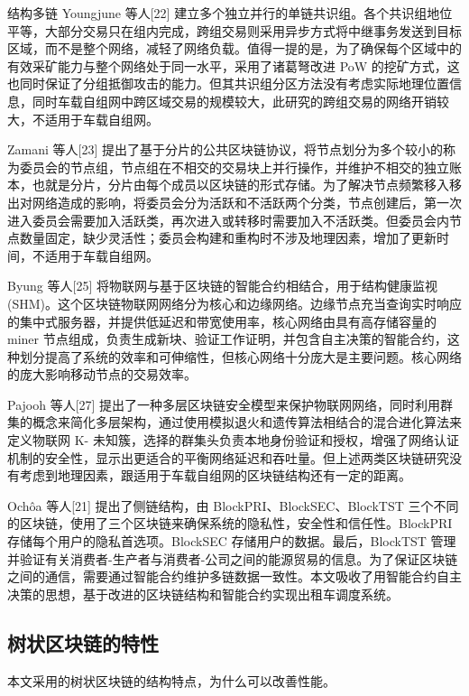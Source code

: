 结构多链
Youngjune 等人[22] 建立多个独立并行的单链共识组。各个共识组地位平等，大部分交易只在组内完成，跨组交易则采用异步方式将中继事务发送到目标区域，而不是整个网络，减轻了网络负载。值得一提的是，为了确保每个区域中的有效采矿能力与整个网络处于同一水平，采用了诸葛弩改进 PoW 的挖矿方式，这也同时保证了分组抵御攻击的能力。但其共识组分区方法没有考虑实际地理位置信息，同时车载自组网中跨区域交易的规模较大，此研究的跨组交易的网络开销较大，不适用于车载自组网。\par
Zamani 等人[23] 提出了基于分片的公共区块链协议，将节点划分为多个较小的称为委员会的节点组，节点组在不相交的交易块上并行操作，并维护不相交的独立账本，也就是分片，分片由每个成员以区块链的形式存储。为了解决节点频繁移入移出对网络造成的影响，将委员会分为活跃和不活跃两个分类，节点创建后，第一次进入委员会需要加入活跃类，再次进入或转移时需要加入不活跃类。但委员会内节点数量固定，缺少灵活性；委员会构建和重构时不涉及地理因素，增加了更新时间，不适用于车载自组网。\par

Byung 等人[25] 将物联网与基于区块链的智能合约相结合，用于结构健康监视 (SHM)。这个区块链物联网网络分为核心和边缘网络。边缘节点充当查询实时响应的集中式服务器，并提供低延迟和带宽使用率，核心网络由具有高存储容量的miner 节点组成，负责生成新块、验证工作证明，并包含自主决策的智能合约，这种划分提高了系统的效率和可伸缩性，但核心网络十分庞大是主要问题。核心网络的庞大影响移动节点的交易效率。\par

Pajooh 等人[27] 提出了一种多层区块链安全模型来保护物联网网络，同时利用群集的概念来简化多层架构，通过使用模拟退火和遗传算法相结合的混合进化算法来定义物联网 K- 未知簇，选择的群集头负责本地身份验证和授权，增强了网络认证机制的安全性，显示出更适合的平衡网络延迟和吞吐量。但上述两类区块链研究没有考虑到地理因素，跟适用于车载自组网的区块链结构还有一定的距离。\par

Ochôa 等人[21] 提出了侧链结构，由 BlockPRI、BlockSEC、BlockTST 三个不同的区块链，使用了三个区块链来确保系统的隐私性，安全性和信任性。BlockPRI 存储每个用户的隐私首选项。BlockSEC 存储用户的数据。最后，BlockTST 管理并验证有关消费者-生产者与消费者-公司之间的能源贸易的信息。为了保证区块链之间的通信，需要通过智能合约维护多链数据一致性。本文吸收了用智能合约自主决策的思想，基于改进的区块链结构和智能合约实现出租车调度系统。\par

\subsection{树状区块链的特性}
本文采用的树状区块链的结构特点，为什么可以改善性能。


